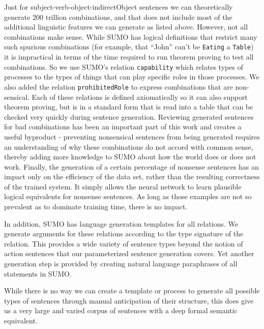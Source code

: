 \documentclass{easychair}
\begin{document}
Just for subject-verb-object-indirectObject sentences we can theoretically generate 200 trillion
combinations, and that does not include most of the additional linguistic features we can generate
as listed above.  However, not all combinations make sense.  While SUMO has logical definitions that
restrict many such spurious combinations (for example, that ``John'' can't be \texttt{Eating} a \texttt{Table}) it is 
impractical in terms of the time required to run theorem proving to test all combinations.  So we
use SUMO's relation \texttt{capability} which relates types of processes to the types of things that can
play specific roles in those processes.  We also added the relation \texttt{prohibitedRole} to express
combinations that are non-sensical.  Each of these relations is defined axiomatically so it can
also support theorem proving, but is in a standard form that is read into a table that can be
checked very quickly during sentence generation.  Reviewing generated sentences for bad combinations
has been an important part of this work and creates a useful byproduct - preventing nonsensical 
sentences from being generated requires an understanding of why these combinations do not accord
with common sense, thereby adding more knowledge to SUMO about how the world does or does not work.
Finally, the generation of a certain percentage of nonsense sentences has an impact only on the efficiency of
the data set, rather than the resulting correctness of the trained system.  It simply allows the neural
network to learn plausible logical equivalents for nonsense sentences.  As long as those examples are
not so prevalent as to dominate training time, there is no impact.

In addition, SUMO has language generation templates for all relations.  We generate arguments for these
relations according to the type signature of the relation.  This provides a wide variety of sentence types
beyond the notion of action sentences that our parameterized sentence generation covers.  Yet another
generation step is provided by creating natural language paraphrases of all statements in SUMO.  

While there is no way we can create a template or process to generate all possible types of sentences
through manual anticipation of their structure, this does give us a very large and varied corpus of
sentences with a deep formal semantic equivalent.

\vspace{10pt}
\end{document}
